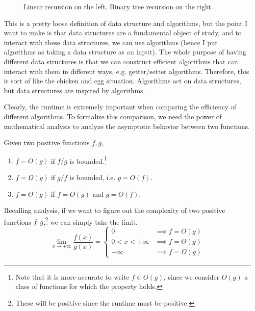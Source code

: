 \documentclass{article}
\begin{document}
\begin{figure}[H]
    \caption{Linear recursion on the left. Binary tree recursion on the right. } 
    \label{fig:recursion_fig}
  \end{figure}

  This is a pretty loose definition of data structure and algorithms, but the point I want to make is that data structures are a fundamental object of study, and to interact with these data structures, we can use algorithms (hence I put algorithms as taking a data structure as an input). The whole purpose of having different data structures is that we can construct efficient algorithms that can interact with them in different ways, e.g. getter/setter algorithms. Therefore, this is sort of like the chicken and egg situation. Algorithms act on data structures, but data structures are inspired by algorithms.  

  Clearly, the runtime is extremely important when comparing the efficiency of different algorithms. To formalize this comparison, we need the power of mathematical analysis to analyze the asymptotic behavior between two functions.  

  \begin{definition}[Complexity]
    Given two positive functions $f, g$, 
    \begin{enumerate}
      \item $f = O(g)$ if $f/g$ is bounded.\footnote{Note that it is more accurate to write $f \in O(g)$, since we consider $O(g)$ a class of functions for which the property holds.} 
      \item $f = \Omega(g)$ if $g/f$ is bounded, i.e. $g = O(f)$. 
      \item $f = \Theta (g)$ if $f = O(g)$ and $g = O(f)$. 
    \end{enumerate}
    Recalling analysis, if we want to figure out the complexity of two positive functions $f, g$,\footnote{These will be positive since the runtime must be positive.} we can simply take the limit. 
    \begin{equation}
      \lim_{x \rightarrow +\infty} \frac{f(x)}{g(x)} = \begin{cases} 
        0 & \implies f = O(g) \\
        0 < x < +\infty & \implies f = \Theta(g) \\
        +\infty & \implies f = \Omega(g)
      \end{cases}
    \end{equation} 
  \end{definition}
\end{document}
